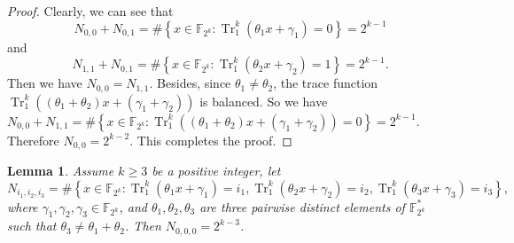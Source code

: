\documentclass[preprint,10pt]{elsarticle}
\newcommand{\F}{\mathbb{F}}
\newcommand{\0}{\textbf{0}}
\newcommand{\1}{\textbf{1}}
\newcommand{\TRACE}{\operatorname{Tr}_1^k}
\theoremstyle{plain}
\newtheorem{lemma}{Lemma}
\begin{document}
   \begin{proof}
        Clearly, we can see that
        \[N_{0,0}+N_{0,1}=\#\left\{x\in\F_{2^k} : \TRACE\left(\theta_1x+\gamma_1\right)=0\right\}=2^{k-1}\]
        and
        \[N_{1,1}+N_{0,1}=\#\left\{x\in\F_{2^k} : \TRACE\left(\theta_2x+\gamma_2\right)=1\right\}=2^{k-1}.\]
        Then we have $N_{0,0} = N_{1,1}$.
        Besides, since $\theta_1\ne\theta_2$, the trace function $\TRACE\left((\theta_1+\theta_2)x+(\gamma_1+\gamma_2)\right)$ is balanced.
        So we have $N_{0,0}+N_{1,1} = \#\left\{x\in\F_{2^k} : \TRACE\left((\theta_1+\theta_2)x+(\gamma_1+\gamma_2)\right)=0\right\}=2^{k-1}$.
        Therefore $N_{0,0}=2^{k-2}$. This completes the proof.
   \end{proof}

    \begin{lemma}\label{lemma:N_ijk_trace}
        Assume $k\ge 3$ be a positive integer, let
        \[ N_{i_1,i_2,i_3}=\#\left\{x\in\F_{2^k} :  \TRACE\left(\theta_1x+\gamma_1\right)=i_1,\TRACE\left(\theta_2x+\gamma_2\right)=i_2,\TRACE\left(\theta_3x+\gamma_3\right)=i_3 \right\},\]
        where  $\gamma_1,\gamma_2,\gamma_3\in\F_{2^k}$, and $\theta_1,\theta_2,\theta_3$ are three pairwise distinct elements of $\F_{2^k}^*$ such that $\theta_3\ne\theta_1+\theta_2$. Then $N_{0,0,0}= 2^{k-3}$.
    \end{lemma}
\end{document}

